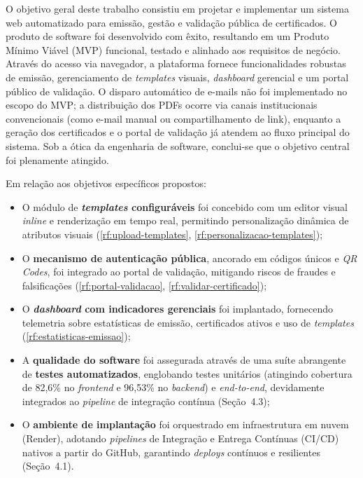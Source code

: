 \documentclass[12pt,openright,oneside,a4paper]{article}
\newcounter{rf}
\newcounter{rn}
\begin{document}
O objetivo geral deste trabalho consistiu em projetar e implementar um sistema web automatizado para emissão, gestão e validação pública de certificados. O produto de software foi desenvolvido com êxito, resultando em um Produto Mínimo Viável (MVP) funcional, testado e alinhado aos requisitos de negócio. Através do acesso via navegador, a plataforma fornece funcionalidades robustas de emissão, gerenciamento de \textit{templates} visuais, \textit{dashboard} gerencial e um portal público de validação. O disparo automático de e-mails não foi implementado no escopo do MVP; a distribuição dos PDFs ocorre via canais institucionais convencionais (como e-mail manual ou compartilhamento de link), enquanto a geração dos certificados e o portal de validação já atendem ao fluxo principal do sistema. Sob a ótica da engenharia de software, conclui-se que o objetivo central foi plenamente atingido.

Em relação aos objetivos específicos propostos:

\begin{itemize}
    \item O módulo de \textbf{\textit{templates} configuráveis} foi concebido com um editor visual \textit{inline} e renderização em tempo real, permitindo personalização dinâmica de atributos visuais (\ref{rf:upload-templates}, \ref{rf:personalizacao-templates});
    \item O \textbf{mecanismo de autenticação pública}, ancorado em códigos únicos e \textit{QR Codes}, foi integrado ao portal de validação, mitigando riscos de fraudes e falsificações (\ref{rf:portal-validacao}, \ref{rf:validar-certificado});
    \item O \textbf{\textit{dashboard} com indicadores gerenciais} foi implantado, fornecendo telemetria sobre estatísticas de emissão, certificados ativos e uso de \textit{templates} (\ref{rf:estatisticas-emissao});
    \item A \textbf{qualidade do software} foi assegurada através de uma suíte abrangente de \textbf{testes automatizados}, englobando testes unitários (atingindo cobertura de 82,6\% no \textit{frontend} e 96,53\% no \textit{backend}) e \textit{end-to-end}, devidamente integrados ao \textit{pipeline} de integração contínua (Seção~4.3);
    \item O \textbf{ambiente de implantação} foi orquestrado em infraestrutura em nuvem (Render), adotando \textit{pipelines} de Integração e Entrega Contínuas (CI/CD) nativos a partir do GitHub, garantindo \textit{deploys} contínuos e resilientes (Seção~4.1).
\end{itemize}
\end{document}
